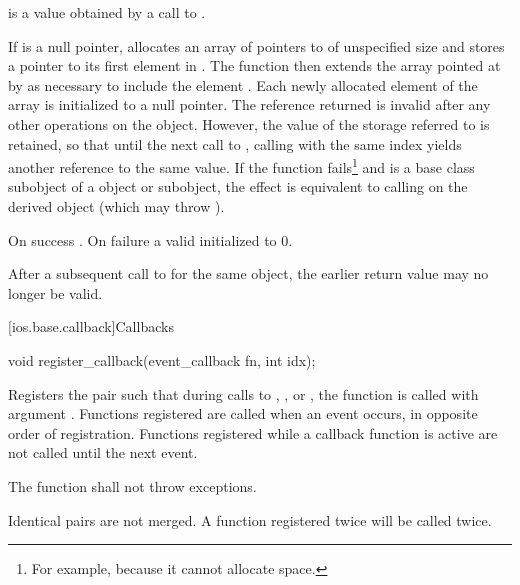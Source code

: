 \begin{itemdescr}
\pnum
\requires
{} is a value obtained by a call to .

\pnum
\effects
If  is a null pointer, allocates an array of
pointers to  of unspecified size and stores a pointer to
its
first element in .
The function then extends the array
pointed at by  as necessary to include the element
.
Each newly allocated element of the array is initialized to a null
pointer.
The reference returned is invalid after any other operations on the
object.
However, the value of the storage referred to is retained, so
that until the next call to
,
calling
with the same index yields another reference to the same value.
If the function fails\footnote{For example, because it cannot allocate space.}
and
is a base class subobject of a
object or subobject, the effect is equivalent to calling
on the derived object (which may throw
).

\pnum
\returns
On success
.
On failure a valid
initialized to 0.

\pnum
\remarks
After a subsequent call to
for the same object, the earlier return value may no longer be valid.
\end{itemdescr}

[ios.base.callback]{Callbacks}

%
\begin{itemdecl}
void register_callback(event_callback fn, int idx);
\end{itemdecl}

\begin{itemdescr}
\pnum
\effects
Registers the pair
such that during calls to
,
,
or
,
the function
is called with argument
.
Functions registered are called when an event occurs, in opposite order of
registration.
Functions registered while a callback function is active are not called until the next event.

\pnum
\requires
The function
shall not throw exceptions.

\pnum
\remarks
Identical pairs are not merged.
A function registered twice will be called twice.
\end{itemdescr}

